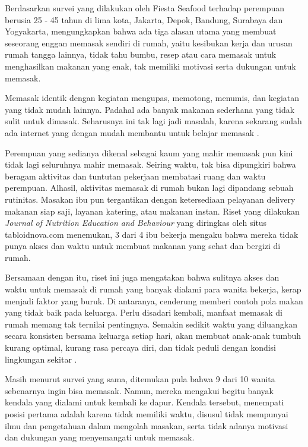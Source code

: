 Berdasarkan survei yang dilakukan oleh Fiesta Seafood terhadap perempuan berusia 25 - 45 tahun di lima kota, Jakarta, Depok, Bandung, Surabaya dan Yogyakarta, mengungkapkan bahwa ada tiga alasan utama yang membuat seseorang enggan memasak sendiri di rumah, yaitu kesibukan kerja dan urusan rumah tangga lainnya, tidak tahu bumbu, resep atau cara memasak untuk menghasilkan makanan yang enak, tak memiliki motivasi serta dukungan untuk memasak. 

Memasak identik dengan kegiatan mengupas, memotong, menumis, dan kegiatan yang tidak mudah lainnya. Padahal ada banyak makanan sederhana yang tidak sulit untuk dimasak. Seharusnya ini tak lagi jadi masalah, karena sekarang sudah ada internet yang dengan mudah membantu untuk belajar memasak \cite{poernomo}.

Perempuan yang sedianya dikenal sebagai kaum yang mahir memasak pun kini tidak lagi seluruhnya mahir memasak. Seiring waktu, tak bisa dipungkiri bahwa beragam aktivitas dan tuntutan pekerjaan membatasi ruang dan waktu perempuan. Alhasil, aktivitas memasak di rumah bukan lagi dipandang sebuah rutinitas. Masakan ibu pun tergantikan dengan ketersediaan pelayanan delivery makanan siap saji, layanan katering, atau makanan instan. Riset yang dilakukan \emph{Journal of Nutrition Education and Behaviour} yang diringkas oleh situs tabloidnova.com menemukan, 3 dari 4 ibu bekerja mengaku bahwa mereka tidak punya akses dan waktu untuk membuat makanan yang sehat dan bergizi di rumah. 

Bersamaan dengan itu, riset ini juga mengatakan bahwa sulitnya akses dan waktu untuk memasak di rumah yang banyak dialami para wanita bekerja, kerap menjadi faktor yang buruk. Di antaranya, cenderung memberi contoh pola makan yang tidak baik pada keluarga. Perlu disadari kembali, manfaat memasak di rumah memang tak ternilai pentingnya. Semakin sedikit waktu yang diluangkan secara konsisten bersama keluarga setiap hari, akan membuat anak-anak tumbuh kurang optimal, kurang rasa percaya diri, dan tidak peduli dengan kondisi lingkungan sekitar \cite{inirani}.

Masih menurut survei yang sama, ditemukan pula bahwa 9 dari 10 wanita sebenarnya ingin bisa memasak. Namun, mereka mengakui begitu banyak kendala yang dialami untuk kembali ke dapur. Kendala tersebut, menempati posisi pertama adalah karena tidak memiliki waktu, disusul tidak mempunyai ilmu dan pengetahuan dalam mengolah masakan, serta tidak adanya motivasi dan dukungan yang menyemangati untuk memasak.

